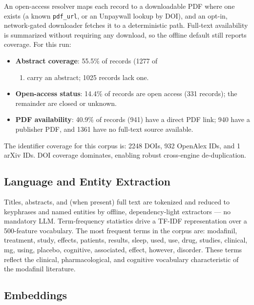 \documentclass[
  english,
]{article}
\providecommand{\tightlist}{%
  \setlength{\itemsep}{0pt}\setlength{\parskip}{0pt}}
\begin{document}
An open-access resolver maps each record to a downloadable PDF where one
exists (a known \texttt{pdf\_url}, or an Unpaywall lookup by DOI), and
an opt-in, network-gated downloader fetches it to a deterministic path.
Full-text availability is summarized without requiring any download, so
the offline default still reports coverage. For this run:

\begin{itemize}
\tightlist
\item
  \textbf{Abstract coverage}: 55.5\% of records (1277 of

  \begin{enumerate}
  \def\labelenumi{\arabic{enumi})}
  \setcounter{enumi}{2301}
  \tightlist
  \item
    carry an abstract; 1025 records lack one.
  \end{enumerate}
\item
  \textbf{Open-access status}: 14.4\% of records are open access (331
  records); the remainder are closed or unknown.
\item
  \textbf{PDF availability}: 40.9\% of records (941) have a direct PDF
  link; 940 have a publisher PDF, and 1361 have no full-text source
  available.
\end{itemize}

The identifier coverage for this corpus is: 2248 DOIs, 932 OpenAlex IDs,
and 1 arXiv IDs. DOI coverage dominates, enabling robust cross-engine
de-duplication.

\subsection{Language and Entity
Extraction}\label{language-and-entity-extraction}

Titles, abstracts, and (when present) full text are tokenized and
reduced to keyphrases and named entities by offline, dependency-light
extractors --- no mandatory LLM. Term-frequency statistics drive a
TF-IDF representation over a 500-feature vocabulary. The most frequent
terms in the corpus are: modafinil, treatment, study, effects, patients,
results, sleep, used, use, drug, studies, clinical, mg, using, placebo,
cognitive, associated, effect, however, disorder. These terms reflect
the clinical, pharmacological, and cognitive vocabulary characteristic
of the modafinil literature.

\subsection{Embeddings}\label{embeddings}
\end{document}

